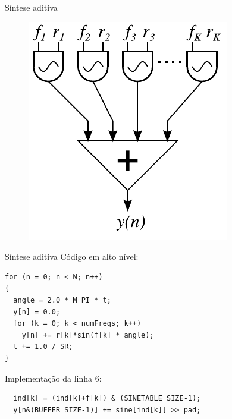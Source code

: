 \begin{frame}{Síntese aditiva}
\begin{figure}
\includegraphics[height=0.8\textheight]{./img/add.pdf}
\end{figure}
\end{frame}

\begin{frame}[fragile]{Síntese aditiva}
\noindent Código em alto nível:
\begin{lstlisting}
for (n = 0; n < N; n++)
{
  angle = 2.0 * M_PI * t;
  y[n] = 0.0;
  for (k = 0; k < numFreqs; k++)
    y[n] += r[k]*sin(f[k] * angle);
  t += 1.0 / SR;
}
\end{lstlisting}
Implementação da linha 6:
\begin{lstlisting}
  ind[k] = (ind[k]+f[k]) & (SINETABLE_SIZE-1);
  y[n&(BUFFER_SIZE-1)] += sine[ind[k]] >> pad;
\end{lstlisting}
\end{frame}


